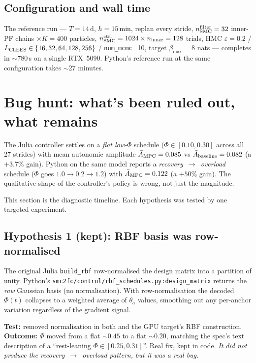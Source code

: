 \documentclass[11pt,a4paper]{article}
\begin{document}
\subsection{Configuration and wall time}

The reference run --- $T=14$\,d, $h=15$\,min, replan every stride,
$n_{\rm SMC}^{\rm filter}=32$ inner-PF chains $\times K=400$ particles,
$n_{\rm SMC}^{\rm ctrl}=1024 \times n_{\rm inner}=128$ trials, HMC
$\varepsilon=0.2$ / $L_{\rm ChEES}\in\{16,32,64,128,256\}$ /
\texttt{num\_mcmc}=10, target $\beta_{\max}=8$ nats --- completes in
$\sim$780\,s on a single RTX~5090. Python's reference run at the same
configuration takes $\sim$27 minutes.

\section{Bug hunt: what's been ruled out, what remains}
\label{sec:bug-hunt}

The Julia controller settles on a \emph{flat low-$\Phi$} schedule
($\Phi \in [0.10, 0.30]$ across all 27 strides) with mean autonomic
amplitude $\bar A_{\rm MPC} = 0.085$ vs $\bar A_{\rm baseline} = 0.082$
(a $+3.7\%$ gain). Python on the same model reports a
\emph{recovery~$\to$~overload} schedule ($\Phi$ goes
$1.0 \to 0.2 \to 1.2$) with $\bar A_{\rm MPC} = 0.122$
(a $+50\%$ gain). The qualitative shape of the controller's policy
is wrong, not just the magnitude.

This section is the diagnostic timeline. Each hypothesis was tested by
one targeted experiment.

\subsection{Hypothesis 1 (kept): RBF basis was row-normalised}

The original Julia \texttt{build\_rbf} row-normalised the design matrix
into a partition of unity. Python's
\texttt{smc2fc/control/rbf\_schedules.py:design\_matrix} returns the
\emph{raw} Gaussian basis (no normalisation). With row-normalisation
the decoded $\Phi(t)$ collapses to a weighted average of $\theta_a$
values, smoothing out any per-anchor variation regardless of the
gradient signal.

\textbf{Test:} removed normalisation in both
 and the GPU target's RBF construction.
\textbf{Outcome:} $\Phi$ moved from a flat $\sim 0.45$ to a flat
$\sim 0.20$, matching the spec's text description of a
``rest-leaning $\Phi \in [0.25, 0.31]$''. Real fix, kept in code.
\emph{It did not produce the recovery~$\to$~overload pattern, but it
was a real bug.}
\end{document}
